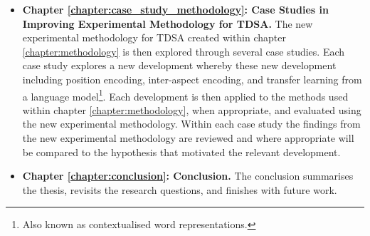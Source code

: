 \begin{itemize}
    \item \textbf{Chapter \ref{chapter:case_study_methodology}: Case Studies in Improving Experimental Methodology for TDSA.}\newline
    The new experimental methodology for TDSA created within chapter \ref{chapter:methodology} is then explored through several case studies. Each case study explores a new development whereby these new development including position encoding, inter-aspect encoding, and transfer learning from a language model\footnote{Also known as contextualised word representations.}. Each development is then applied to the methods used within chapter \ref{chapter:methodology}, when appropriate, and evaluated using the new experimental methodology. Within each case study the findings from the new experimental methodology are reviewed and where appropriate will be compared to the hypothesis that motivated the relevant development.   
    \item \textbf{Chapter \ref{chapter:conclusion}: Conclusion.}\newline
    The conclusion summarises the thesis, revisits the research questions, and finishes with future work.
\end{itemize}